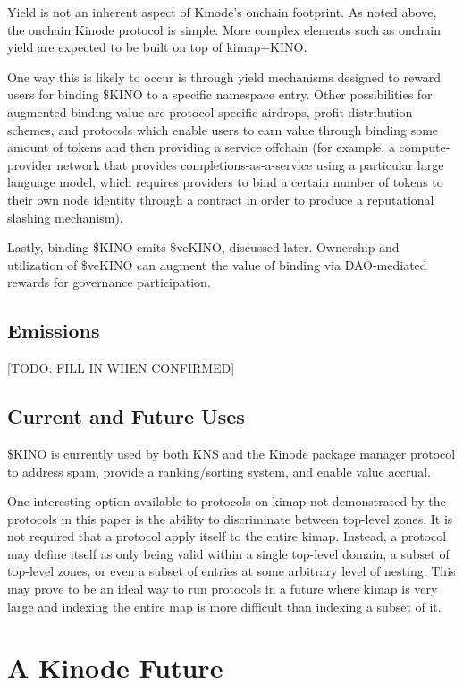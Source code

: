 \documentclass[runningheads]{llncs}
\begin{document}
Yield is not an inherent aspect of Kinode's onchain footprint.
As noted above, the onchain Kinode protocol is simple.
More complex elements such as onchain yield are expected to be built on top of kimap+KINO.

One way this is likely to occur is through yield mechanisms designed to reward users for binding \$KINO to a specific namespace entry. Other possibilities for augmented binding value are protocol-specific airdrops, profit distribution schemes, and protocols which enable users to earn value through binding some amount of tokens and then providing a service offchain (for example, a compute-provider network that provides completions-as-a-service using a particular large language model, which requires providers to bind a certain number of tokens to their own node identity through a contract in order to produce a reputational slashing mechanism).

Lastly, binding \$KINO emits \$veKINO, discussed later.
Ownership and utilization of \$veKINO can augment the value of binding via DAO-mediated rewards for governance participation.

\subsection{Emissions}
\label{sec:kinoemissions}

[TODO: FILL IN WHEN CONFIRMED]

\subsection{Current and Future Uses}
\label{sec:kinouses}

\$KINO is currently used by both KNS and the Kinode package manager protocol to address spam, provide a ranking/sorting system, and enable value accrual.

One interesting option available to protocols on kimap not demonstrated by the protocols in this paper is the ability to discriminate between top-level zones.
It is not required that a protocol apply itself to the entire kimap.
Instead, a protocol may define itself as only being valid within a single top-level domain, a subset of top-level zones, or even a subset of entries at some arbitrary level of nesting.
This may prove to be an ideal way to run protocols in a future where kimap is very large and indexing the entire map is more difficult than indexing a subset of it.

\section{A Kinode Future}
\label{sec:future}
\end{document}
